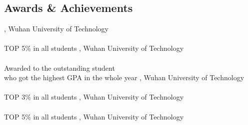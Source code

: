 \documentclass[mm]{simple_style}
\begin{document}
\begin{resume}
\section{Awards \& Achievements}
  , Wuhan University of Technology\\
\newline
{}\\ TOP 5\% in all students , Wuhan University of Technology\\
\newline
{} \\
Awarded to the outstanding student \\
who got the highest GPA in the whole year , Wuhan University of Technology\\
\newline
{}\\ TOP 3\% in all students , Wuhan University of Technology\\
\newline
{}\\ TOP 5\% in all students , Wuhan University of Technology\\


\vspace{-2ex}
\sectionline


\end{resume}
\end{document}
